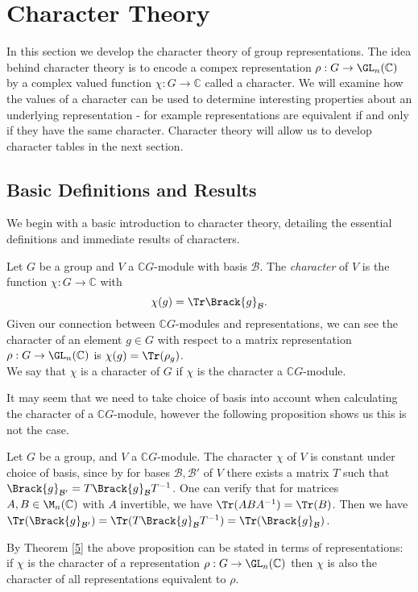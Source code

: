 \documentclass[../Project.tex]{subfiles}
\begin{document}
\newpage
\section{Character Theory}
In this section we develop the character theory of group representations. The idea behind character theory is to encode a compex representation $\rho : G \to \GL_n(\mathbb{C})$ by a complex valued function $\chi : G \to \mathbb{C}$ called a character. We will examine how the values of a character can be used to determine interesting properties about an underlying representation - for example representations are equivalent if and only if they have the same character. Character theory will allow us to develop character tables in the next section.
\subsection{Basic Definitions and Results}
We begin with a basic introduction to character theory, detailing the essential definitions and immediate results of characters.
\begin{defi}
	Let $G$ be a group and $V$ a $\mathbb{C}G$-module with basis $\mathcal{B}$. The \textit{character} of $V$ is the function $\chi : G \to \mathbb{C}$ with
	$$\chi(g) = \Tr\Brack{g}_\mathcal{B}.$$
	Given our connection between $\mathbb{C}G$-modules and representations, we can see the character of an element $g \in G$ with respect to a matrix representation $\rho : G \to \GL_n(\mathbb{C})$ is $\chi(g) = \Tr(\rho_g)$.\\

	We say that $\chi$ is a character of $G$ if $\chi$ is the character a $\mathbb{C}G$-module.\\
\end{defi}

It may seem that we need to take choice of basis into account when calculating the character of a $\mathbb{C}G$-module, however the following proposition shows us this is not the case.

\begin{prop}[{\cite[Definition 13.3]{2}}]
\label{mehbasisch}
Let $G$ be a group, and $V$ a $\mathbb{C}G$-module. The character $\chi$ of $V$ is constant under choice of basis, since by for bases $\mathcal{B}, \mathcal{B}'$ of $V$ there exists a matrix $T$ such that
$\Brack{g}_{\mathcal{B}'} = T\Brack{g}_\mathcal{B}T^{-1}$.  One can verify that for matrices $A,B \in \M_n(\mathbb{C})$ with $A$ invertible, we have $\Tr(ABA^{-1}) = \Tr(B)$. Then we have $\Tr(\Brack{g}_{\mathcal{B}'}) = \Tr(T\Brack{g}_\mathcal{B}T^{-1}) = \Tr(\Brack{g}_\mathcal{B})$.
\end{prop}
By Theorem \ref{5} the above proposition can be stated in terms of representations: if $\chi$ is the character of a representation $\rho : G \to \GL_n(\mathbb{C})$ then $\chi$ is also the character of all representations equivalent to $\rho$.\\
\end{document}
